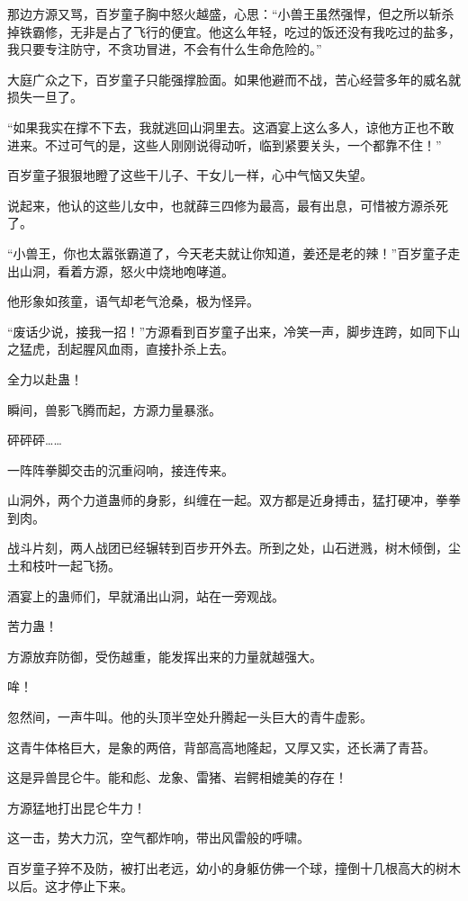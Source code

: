 
\begin{this_body}

那边方源又骂，百岁童子胸中怒火越盛，心思：“小兽王虽然强悍，但之所以斩杀掉铁霸修，无非是占了飞行的便宜。他这么年轻，吃过的饭还没有我吃过的盐多，我只要专注防守，不贪功冒进，不会有什么生命危险的。”

大庭广众之下，百岁童子只能强撑脸面。如果他避而不战，苦心经营多年的威名就损失一旦了。

“如果我实在撑不下去，我就逃回山洞里去。这酒宴上这么多人，谅他方正也不敢进来。不过可气的是，这些人刚刚说得动听，临到紧要关头，一个都靠不住！”

百岁童子狠狠地瞪了这些干儿子、干女儿一样，心中气恼又失望。

说起来，他认的这些儿女中，也就薛三四修为最高，最有出息，可惜被方源杀死了。

“小兽王，你也太嚣张霸道了，今天老夫就让你知道，姜还是老的辣！”百岁童子走出山洞，看着方源，怒火中烧地咆哮道。

他形象如孩童，语气却老气沧桑，极为怪异。

“废话少说，接我一招！”方源看到百岁童子出来，冷笑一声，脚步连跨，如同下山之猛虎，刮起腥风血雨，直接扑杀上去。

全力以赴蛊！

瞬间，兽影飞腾而起，方源力量暴涨。

砰砰砰……

一阵阵拳脚交击的沉重闷响，接连传来。

山洞外，两个力道蛊师的身影，纠缠在一起。双方都是近身搏击，猛打硬冲，拳拳到肉。

战斗片刻，两人战团已经辗转到百步开外去。所到之处，山石迸溅，树木倾倒，尘土和枝叶一起飞扬。

酒宴上的蛊师们，早就涌出山洞，站在一旁观战。

苦力蛊！

方源放弃防御，受伤越重，能发挥出来的力量就越强大。

哞！

忽然间，一声牛叫。他的头顶半空处升腾起一头巨大的青牛虚影。

这青牛体格巨大，是象的两倍，背部高高地隆起，又厚又实，还长满了青苔。

这是异兽昆仑牛。能和彪、龙象、雷猪、岩鳄相媲美的存在！

方源猛地打出昆仑牛力！

这一击，势大力沉，空气都炸响，带出风雷般的呼啸。

百岁童子猝不及防，被打出老远，幼小的身躯仿佛一个球，撞倒十几根高大的树木以后。这才停止下来。


\end{this_body}
